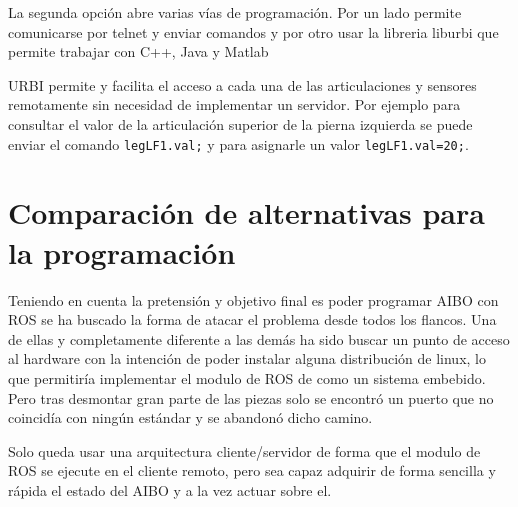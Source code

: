 \documentclass[12pt,a4paper,final,twoside]{article}
\begin{document}
La segunda opción abre varias vías de programación. Por un lado permite comunicarse por telnet y enviar comandos y por otro usar la libreria liburbi que permite trabajar con C++, Java y Matlab

URBI permite y facilita el acceso a cada una de las articulaciones y sensores remotamente sin necesidad de implementar un servidor. Por ejemplo para consultar el valor de la articulación superior de la pierna izquierda se puede enviar el comando \texttt{legLF1.val;} y para asignarle un valor \texttt{legLF1.val=20;}\cite{urbicmd}.

\clearpage



\section{Comparación de alternativas para la programación}\label{seccomp}
Teniendo en cuenta la pretensión y objetivo final es poder programar AIBO con ROS se ha buscado la forma de atacar el problema desde todos los flancos. 
Una de ellas y completamente diferente a las demás ha sido buscar un punto de acceso al hardware con la intención de poder instalar alguna distribución de linux, lo que permitiría implementar el modulo de ROS de como un sistema embebido. Pero tras desmontar gran parte de las piezas solo se encontró un puerto que no coincidía con ningún estándar y se abandonó dicho camino.  

Solo queda usar una arquitectura cliente/servidor de forma que el modulo de ROS se ejecute en el cliente remoto, pero sea capaz adquirir de forma sencilla y rápida el estado del AIBO y a la vez actuar sobre el.
\end{document}

